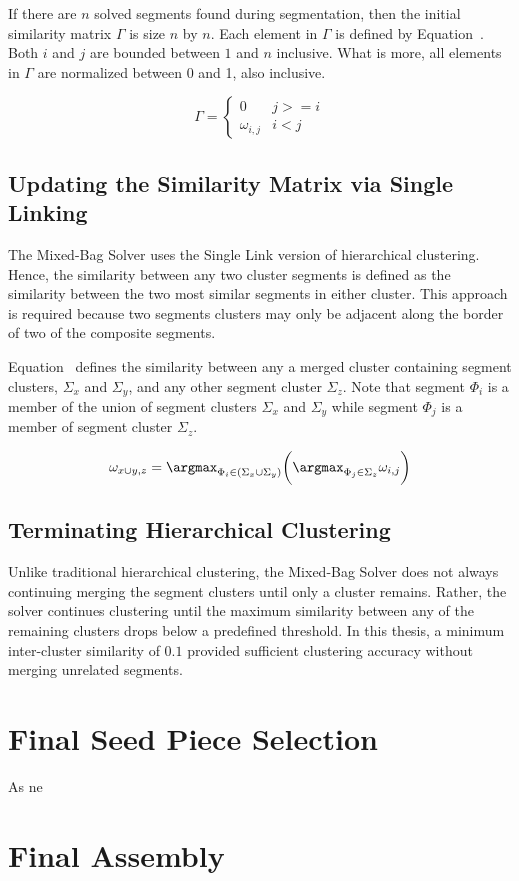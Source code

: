If there are $n$ solved segments found during segmentation, then the initial similarity matrix $\Gamma$ is size $n$ by $n$.  Each element in $\Gamma$ is defined by Equation~.  Both $i$ and $j$ are bounded between $1$ and $n$ inclusive.  What is more, all elements in $\Gamma$ are normalized between 0 and 1, also inclusive.

\begin{equation} \label{eq:similarityMatrix}
\Gamma = \begin{cases} 
	0 & j >= i
\\
	\omega_{i,j} & i < j
\end{cases} 
\end{equation}

\subsection{Updating the Similarity Matrix via Single Linking}

The Mixed-Bag Solver uses the Single Link version of hierarchical clustering.  Hence, the similarity between any two cluster segments is defined as the similarity between the two most similar segments in either cluster.  This approach is required because two segments clusters may only be adjacent along the border of two of the composite segments.  

Equation~ defines the similarity between any a merged cluster containing segment clusters, $\Sigma_x$ and $\Sigma_y$, and any other segment cluster $\Sigma_z$.  Note that segment $\Phi_i$ is a member of the union of segment clusters $\Sigma_x$ and $\Sigma_y$ while segment $\Phi_j$ is a member of segment cluster $\Sigma_z$.

\begin{equation} \label{eq:segmentClusterMerge}
	\omega_{x \cup y,z} = \argmax_{\Phi_i \in (\Sigma_x \cup \Sigma_y)} \bigg( \argmax_{\Phi_j \in \Sigma_z} \omega_{i,j} \bigg) 
\end{equation}

\subsection{Terminating Hierarchical Clustering}

Unlike traditional hierarchical clustering, the Mixed-Bag Solver does not always continuing merging the segment clusters  until only a cluster remains. Rather, the solver continues clustering until the maximum similarity between any of the remaining clusters drops below a predefined threshold.  In this thesis, a minimum inter-cluster similarity of $0.1$ provided sufficient clustering accuracy without merging unrelated segments.

\section{Final Seed Piece Selection}\label{sec:finalSeedPiece}

As ne

\section{Final Assembly}